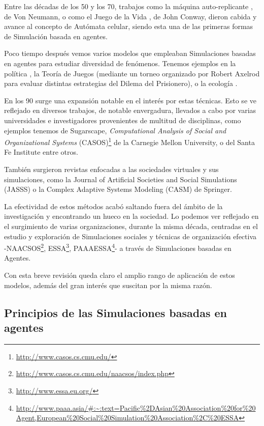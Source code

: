 Entre las décadas de los 50 y los 70, trabajos como la máquina auto-replicante \citep{neumann1966theory} , de Von Neumann, o como el Juego de la Vida \citep{gardner1970fantastic}, de John Conway, dieron cabida y avance al concepto de Autómata celular, siendo esta una de las primeras formas de Simulación basada en agentes.

Poco tiempo después vemos varios modelos que empleaban Simulaciones basadas en agentes para estudiar diversidad de fenómenos. Tenemos ejemplos en la política \citep{schelling1971dynamic}, la Teoría de Juegos (mediante un torneo organizado por Robert Axelrod para evaluar distintas estrategias del Dilema del Prisionero), o la ecología \citep{hogeweg1983ontogeny}.

En los 90 surge una expansión notable en el interés por estas técnicas. Esto se ve reflejado en diversos trabajos, de notable envergadura, llevados a cabo por varias universidades e investigadores provenientes de multitud de disciplinas, como ejemplos tenemos \cite{epstein1996growing} de Sugarscape, \textit{Computational Analysis of Social and Organizational Systems} (CASOS)\footnote{\url{http://www.casos.cs.cmu.edu/}} de la Carnegie Mellon University, o \cite{kohler2000dynamics} del Santa Fe Institute  entre otros.

También surgieron revistas enfocadas a las sociedades virtuales y sus simulaciones, como la Journal of Artificial Societies and Social Simulations (JASSS) o la Complex Adaptive Systems Modeling (CASM) de Springer.

La efectividad de estos métodos acabó saltando fuera del ámbito de la investigación y encontrando un hueco en la sociedad. Lo podemos ver reflejado en el surgimiento de varias organizaciones, durante la misma década, centradas en el estudio y exploración de Simulaciones sociales y técnicas de organización efectiva -NAACSOS\footnote{\url{http://www.casos.cs.cmu.edu/naacsos/index.php}}, ESSA\footnote{\url{http://www.essa.eu.org/}}, PAAAESSA\footnote{\url{http://www.paaa.asia/\#:~:text=Pacific\%2DAsian\%20Association\%20for\%20Agent,European\%20Social\%20Simulation\%20Association\%2C\%20ESSA}}- a través de Simulaciones basadas en Agentes.

Con esta breve revisión queda claro el amplio rango de aplicación de estos modelos, además del gran interés que suscitan por la misma razón.

\subsection{Principios de las Simulaciones basadas en agentes}

